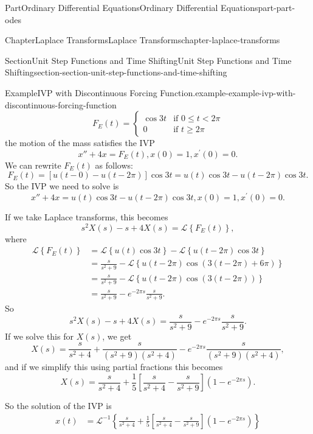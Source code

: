 \documentclass[twoside,10pt,]{book}
\numberwithin{equation}{part}
\newcommand{\Laplace}[1]{\mathcal{L}\set{#1}}
\newcommand{\iLaplace}[1]{\mathcal{L}^{-1}\set{#1}}
\newcommand{\set}[1]{\left\{ #1 \right\}}
\newcommand{\parens}[1]{\left( #1 \right)}
\newcommand{\lt}{<}
\newcommand{\amp}{&}
\begin{document}
\begin{partptx}{Part}{Ordinary Differential Equations}{}{Ordinary Differential Equations}{}{}{part-part-odes}
\begin{chapterptx}{Chapter}{Laplace Transforms}{}{Laplace Transforms}{}{}{chapter-laplace-transforms}
\begin{sectionptx}{Section}{Unit Step Functions and Time Shifting}{}{Unit Step Functions and Time Shifting}{}{}{section-section-unit-step-functions-and-time-shifting}
\begin{example}{Example}{IVP with Discontinuous Forcing Function.}{example-example-ivp-with-discontinuous-forcing-function}
\begin{equation*}
F_{E}(t) = 
\begin{cases}
\cos3t \amp\text{if }0\leq t\lt 2\pi\\
0 \amp\text{if }t\geq2\pi  
\end{cases}
\end{equation*}
the motion of the mass satisfies the IVP%
\begin{equation*}
x''+4x = F_{E}(t), x(0) = 1, x^\prime(0) = 0.
\end{equation*}
We can rewrite \(F_{E}(t)\) as follows:%
\begin{equation*}
F_{E}(t) = [u(t-0)-u(t-2\pi)]\cos3t = u(t)\cos3t - u(t-2\pi)\cos3t.
\end{equation*}
So the IVP we need to solve is%
\begin{equation*}
x''+4x = u(t)\cos3t - u(t-2\pi)\cos3t, x(0) = 1, x^\prime(0) = 0.
\end{equation*}
%
\par
If we take Laplace transforms, this becomes%
\begin{equation*}
s^{2}X(s) - s + 4X(s) = \Laplace{F_{E}(t)},
\end{equation*}
where%
\begin{align*}
\Laplace{F_{E}(t)} &= \Laplace{u(t)\cos3t} - \Laplace{u(t-2\pi)\cos3t}\\
&= \frac{s}{s^{2}+9} - \Laplace{u(t-2\pi)\cos(3(t-2\pi)+6\pi)}\\
&= \frac{s}{s^{2}+9} - \Laplace{u(t-2\pi)\cos(3(t-2\pi))}\\
&= \frac{s}{s^{2}+9} - e^{-2\pi s}\frac{s}{s^{2}+9}\text{.}
\end{align*}
So%
\begin{equation*}
s^{2}X(s) - s + 4X(s) = \frac{s}{s^{2}+9} - e^{-2\pi s}\frac{s}{s^{2}+9}.
\end{equation*}
If we solve this for \(X(s)\), we get%
\begin{equation*}
X(s) = \frac{s}{s^{2}+4} + \frac{s}{(s^{2}+9)(s^{2}+4)} - e^{-2\pi s}\frac{s}{(s^{2}+9)(s^{2}+4)},
\end{equation*}
and if we simplify this using partial fractions this becomes%
\begin{equation*}
X(s) = \frac{s}{s^{2}+4} + \frac{1}{5}\left[\frac{s}{s^{2}+4} - \frac{s}{s^{2}+9}\right]\parens{1-e^{-2\pi s}}.
\end{equation*}
%
\par
So the solution of the IVP is%
\begin{align*}
x(t) &= \iLaplace{\frac{s}{s^{2}+4} + \frac{1}{5}\left[\frac{s}{s^{2}+4} - \frac{s}{s^{2}+9}\right]\parens{1-e^{-2\pi s}}}\\

\end{align*}
\end{example}
\end{sectionptx}
\end{chapterptx}
\end{partptx}
\end{document}
